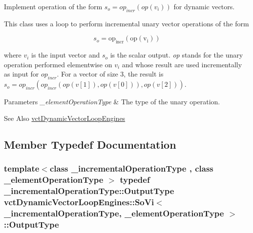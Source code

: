 Implement operation of the form $s_o = op_{incr}(op(v_i))$ for dynamic vectors. 

This class uses a loop to perform incremental unary vector operations of the form

\[ s_o = \mathrm{op_{incr}(\mathrm{op}(v_i))} \]

where $v_i$ is the input vector and $s_o$ is the scalar output. {\itshape op} stands for the unary operation performed elementwise on $v_i$ and whose result are used incrementally as input for $op_{incr}$. For a vector of size 3, the result is $s_o = op_{incr}(op_{incr}(op(v[1]), op(v[0])), op(v[2])) $.


\begin{DoxyParams}{Parameters}
{\em \-\_\-element\-Operation\-Type} & The type of the unary operation.\\
\hline
\end{DoxyParams}
\begin{DoxySeeAlso}{See Also}
\hyperlink{classvct_dynamic_vector_loop_engines}{vct\-Dynamic\-Vector\-Loop\-Engines} 
\end{DoxySeeAlso}


\subsection{Member Typedef Documentation}
\hypertarget{classvct_dynamic_vector_loop_engines_1_1_so_vi_a0e42560add0a15a5c8722aee8a9aa78c}{
\subsubsection[{Output\-Type}]{\setlength{\rightskip}{0pt plus 5cm}template$<$class \-\_\-incremental\-Operation\-Type , class \-\_\-element\-Operation\-Type $>$ typedef \-\_\-incremental\-Operation\-Type\-::\-Output\-Type {\bf vct\-Dynamic\-Vector\-Loop\-Engines\-::\-So\-Vi}$<$ \-\_\-incremental\-Operation\-Type, \-\_\-element\-Operation\-Type $>$\-::{\bf Output\-Type}}}\label{classvct_dynamic_vector_loop_engines_1_1_so_vi_a0e42560add0a15a5c8722aee8a9aa78c}


